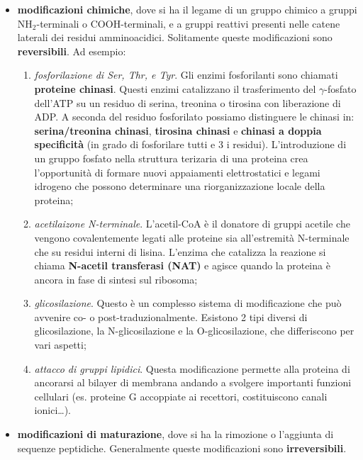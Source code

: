\documentclass[11pt]{book}
\begin{document}
\begin{itemize}
\itemsep1pt\parskip0pt
\item
  \textbf{modificazioni chimiche}, dove si ha il legame di un gruppo
  chimico a gruppi NH\(_2\)-terminali o COOH-terminali, e a gruppi
  reattivi presenti nelle catene laterali dei residui amminoacidici.
  Solitamente queste modificazioni sono \textbf{reversibili}. Ad
  esempio:

  \begin{enumerate}
  \def\labelenumi{\arabic{enumi}.}
  \itemsep1pt\parskip0pt
  \item
    \emph{fosforilazione di Ser, Thr, e Tyr}. Gli enzimi fosforilanti
    sono chiamati \textbf{proteine chinasi}. Questi enzimi catalizzano
    il trasferimento del \(\gamma\)-fosfato dell'ATP su un residuo di
    serina, treonina o tirosina con liberazione di ADP. A seconda del
    residuo fosforilato possiamo distinguere le chinasi in:
    \textbf{serina/treonina chinasi}, \textbf{tirosina chinasi} e
    \textbf{chinasi a doppia specificità} (in grado di fosforilare tutti
    e 3 i residui). L'introduzione di un gruppo fosfato nella struttura
    terizaria di una proteina crea l'opportunità di formare nuovi
    appaiamenti elettrostatici e legami idrogeno che possono determinare
    una riorganizzazione locale della proteina;
  \item
    \emph{acetilaizone N-terminale}. L'acetil-CoA è il donatore di
    gruppi acetile che vengono covalentemente legati alle proteine sia
    all'estremità N-terminale che su residui interni di lisina. L'enzima
    che catalizza la reazione si chiama \textbf{N-acetil transferasi
    (NAT)} e agisce quando la proteina è ancora in fase di sintesi sul
    ribosoma;
  \item
    \emph{glicosilazione}. Questo è un complesso sistema di
    modificazione che può avvenire co- o post-traduzionalmente. Esistono
    2 tipi diversi di glicosilazione, la N-glicosilazione e la
    O-glicosilazione, che differiscono per vari aspetti;
  \item
    \emph{attacco di gruppi lipidici}. Questa modificazione permette
    alla proteina di ancorarsi al bilayer di membrana andando a svolgere
    importanti funzioni cellulari (es. proteine G accoppiate ai
    recettori, costituiscono canali ionici\ldots{}).
  \end{enumerate}
\item
  \textbf{modificazioni di maturazione}, dove si ha la rimozione o
  l'aggiunta di sequenze peptidiche. Generalmente queste modificazioni
  sono \textbf{irreversibili}.


\end{itemize}
\end{document}

